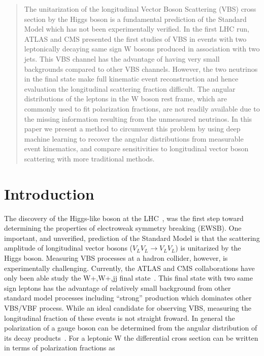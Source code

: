 \documentclass[10pt,twocolumn]{article}
\begin{document}
\begin{abstract}The unitarization of the longitudinal Vector Boson Scattering (VBS) cross section by the Higgs boson is a fundamental prediction of the Standard Model which has not been experimentally verified. In the first LHC run, ATLAS and CMS presented the first studies of VBS in events with two leptonically decaying same sign W bosons produced in association with two jets. This VBS channel has the advantage of having very small backgrounds compared to other VBS channels. However, the two neutrinos in the final state make full kinematic event reconstruction and hence evaluation the longitudinal scattering fraction difficult. The angular distributions of the leptons in the W boson rest frame, which are commonly used to fit polarization fractions, are not readily available due to the missing information resulting from the unmeasured neutrinos. In this paper we present a method to circumvent this problem by using deep machine learning to recover the angular distributions from measurable event kinematics, and compare sensitivities to longitudinal vector boson scattering with more traditional methods.
\end{abstract}

\section{Introduction}


The discovery of the Higgs-like boson at the LHC~\cite{ATLAS_higgs,CMS_higgs}, was the first step toward determining the properties of electroweak symmetry breaking (EWSB). One important, and unverified, prediction of the Standard Model is that the scattering amplitude of longitudinal vector bosons ($V_{L}V_{L} \rightarrow V_{L}V_{L}$) is unitarized by the Higgs boson. Measuring VBS processes at a hadron collider, however, is experimentally challenging. Currently, the ATLAS and CMS collaborations have only been able study the  W+,W+,jj final state~\cite{ATLAS_ssWW,CMS_ssWW}. This final state with two same sign leptons has the advantage of relatively small background from other standard model processes including  ``strong'' production which dominates other VBS/VBF process. While an ideal candidate for observing VBS, measuring the longitudinal fraction of these events is not straight froward. In general the polarization of a gauge boson can be determined from the angular distribution of its decay products~\cite{?}. For a leptonic W the differential cross section can be written in terms of polarization fractions as
\end{document}
